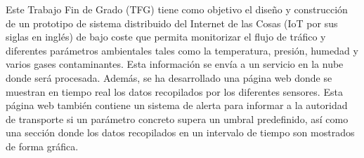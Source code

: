 Este Trabajo Fin de Grado (TFG) tiene como objetivo el diseño y construcción de un prototipo de sistema distribuido del Internet de las Cosas (IoT por sus siglas en inglés) de bajo coste que permita monitorizar el flujo de tráfico y diferentes parámetros ambientales tales como la temperatura, presión, humedad y varios gases contaminantes. Esta información se envía a un servicio en la nube donde será procesada. Además, se ha desarrollado una página web donde se muestran en tiempo real los datos recopilados por los diferentes sensores. Esta página web también contiene un sistema de alerta para informar a la autoridad de transporte si un parámetro concreto supera un umbral predefinido, así como una sección donde los datos recopilados en un intervalo de tiempo son mostrados de forma gráfica.



